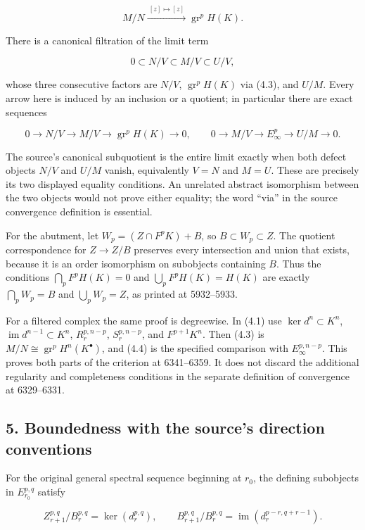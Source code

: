 \documentclass[11pt]{article}
\begin{document}
\[
M/N\xrightarrow{\ [z]\mapsto[z]\ }
\operatorname{gr}^pH(K).                  \tag{4.3}
\]

There is a canonical filtration of the limit term

\[
0\subset N/V\subset M/V\subset U/V,
\]

whose three consecutive factors are \(N/V\), \(\operatorname{gr}^pH(K)\) via (4.3), and \(U/M\). Every arrow here is induced by an inclusion or a quotient; in particular there are exact sequences

\[
0\to N/V\to M/V\to\operatorname{gr}^pH(K)\to0,
\qquad
0\to M/V\to E_\infty^p\to U/M\to0.          \tag{4.4}
\]

The source's canonical subquotient is the entire limit exactly when both defect objects \(N/V\) and \(U/M\) vanish, equivalently \(V=N\) and \(M=U\). These are precisely its two displayed equality conditions. An unrelated abstract isomorphism between the two objects would not prove either equality; the word ``via'' in the source convergence definition is essential.

For the abutment, let \(W_p=(Z\cap F^pK)+B\), so \(B\subset W_p\subset Z\). The quotient correspondence for \(Z\to Z/B\) preserves every intersection and union that exists, because it is an order isomorphism on subobjects containing \(B\). Thus the conditions \(\bigcap_pF^pH(K)=0\) and \(\bigcup_pF^pH(K)=H(K)\) are exactly \(\bigcap_pW_p=B\) and \(\bigcup_pW_p=Z\), as printed at 5932--5933.

For a filtered complex the same proof is degreewise. In (4.1) use \(\ker d^n\subset K^n\), \(\operatorname{im}d^{n-1}\subset K^n\), \(R_r^{p,n-p}\), \(S_r^{p,n-p}\), and \(F^{p+1}K^n\). Then (4.3) is \(M/N\cong\operatorname{gr}^pH^n(K^\bullet)\), and (4.4) is the specified comparison with \(E_\infty^{p,n-p}\). This proves both parts of the criterion at 6341--6359. It does not discard the additional regularity and completeness conditions in the separate definition of convergence at 6329--6331.

\subsection{5. Boundedness with the source's direction conventions}\label{note-06-boundedness-with-the-sources-direction-conventions}

For the original general spectral sequence beginning at \(r_0\), the defining subobjects in \(E_{r_0}^{p,q}\) satisfy

\[
Z_{r+1}^{p,q}/B_r^{p,q}=\ker(d_r^{p,q}),\qquad
B_{r+1}^{p,q}/B_r^{p,q}
=\operatorname{im}(d_r^{p-r,q+r-1}).
\]
\end{document}
